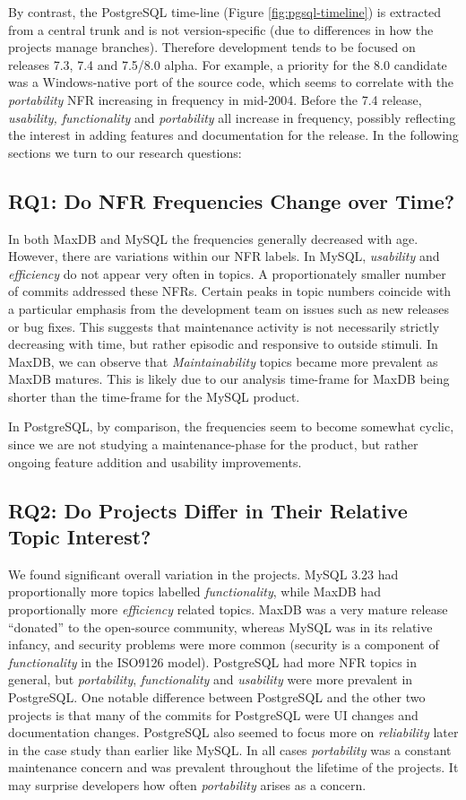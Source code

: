 \documentclass[smallextended]{svjour3}       %
\begin{document}
By contrast, the PostgreSQL time-line  (Figure \ref{fig:pgsql-timeline}) is extracted from a central trunk and is not version-specific (due to differences in how the projects manage branches). Therefore development 
tends to be focused on releases 7.3, 7.4 and 7.5/8.0 alpha. For example, a priority for the 8.0 candidate was a Windows-native port of the source code, which seems to 
correlate with the \emph{portability} NFR increasing in frequency in mid-2004. Before the 7.4 release, \emph{usability, functionality} and \emph{portability} all 
increase in frequency, possibly reflecting the interest in adding features and documentation for the release. In the following sections we turn to our research questions:


\subsection{RQ1: Do NFR Frequencies Change over Time?}
In both MaxDB and MySQL the frequencies generally decreased with age. 
However, there are variations within our NFR labels. In MySQL, \emph{usability} and \emph{efficiency} do not appear very often in topics. 
A proportionately smaller number of commits addressed these NFRs.
Certain peaks in topic numbers coincide with a particular emphasis from the development team on issues such as new releases or bug fixes.
This suggests that maintenance activity is not necessarily strictly decreasing with time, but rather episodic and responsive to outside stimuli. 
In MaxDB, we can observe that \emph{Maintainability} topics became more prevalent as MaxDB matures. 
This is likely due to our analysis time-frame for MaxDB being shorter than the time-frame for the MySQL product. 

In PostgreSQL, by comparison, the frequencies seem to become somewhat cyclic, since we are not studying a maintenance-phase for the product, but rather ongoing
feature addition and usability improvements.

\subsection{RQ2: Do Projects Differ in Their Relative  Topic Interest?}
We found significant overall variation in the projects. MySQL 3.23 had proportionally more
topics labelled \emph{functionality}, while MaxDB had proportionally more
\emph{efficiency} related topics. MaxDB was a very mature release ``donated'' to the open-source community, 
whereas MySQL was in its relative infancy, and	
security problems were more common (security is a component of \emph{functionality} in the ISO9126 model). 
PostgreSQL had more NFR topics in general, but \emph{portability},
\emph{functionality} and \emph{usability} were more prevalent in
PostgreSQL. One notable difference between PostgreSQL and the other
two projects is that many of the commits for PostgreSQL were UI
changes and documentation changes. PostgreSQL also seemed to focus
more on \emph{reliability} later in the case study than earlier like MySQL.
In all cases \emph{portability} was a constant maintenance concern and was prevalent throughout the lifetime of the projects. It may surprise developers
how often \emph{portability} arises as a concern.
\end{document}
